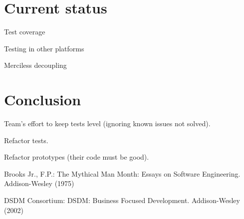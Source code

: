 \documentclass[lnbip]{svmultln}
\begin{document}
\section{Current status}
\label{sec:nowadays}

Test coverage

Testing in other platforms

Merciless decoupling

\section{Conclusion}
\label{sec:conclusion}

Team's effort to keep tests level (ignoring known issues not solved).

Refactor tests.

Refactor prototypes (their code must be good).



%
%
\begin{thebibliography}{5}

 Brooks Jr., F.P.: The Mythical Man Month: Essays
  on Software Engineering. Addison-Wesley (1975)

 DSDM Consortium: DSDM: Business Focused Development. Addison-Wesley (2002)

\end{thebibliography}
%
\end{document}
